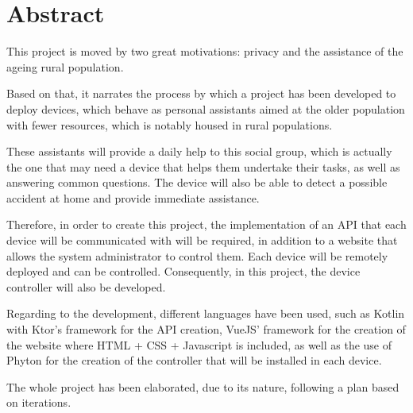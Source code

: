\documentclass[openright,twoside,10pt]{book}
\begin{document}
\chapter*{Abstract} %
\begin{flushleft} %

This project is moved by two great motivations: privacy and the assistance of the ageing rural population. 

Based on that, it narrates the process by which a project has been developed to deploy devices, which behave as personal assistants aimed at the older population with fewer resources, which is notably housed in rural populations. 

These assistants will provide a daily help to this social group, which is actually the one that may need a device that helps them undertake their tasks, as well as answering common questions. The device will also be able to detect a possible accident at home and provide immediate assistance. 

Therefore, in order to create this project, the implementation of an API that each device will be communicated with will be required, in addition to a website that allows the system administrator to control them. Each device will be remotely deployed and can be controlled. Consequently, in this project, the device controller will also be developed. 

Regarding to the development, different languages have been used, such as Kotlin with Ktor’s framework for the API creation, VueJS’ framework for the creation of the website where HTML + CSS + Javascript is included, as well as the use of Phyton for the creation of the controller that will be installed in each device. 

The whole project has been elaborated, due to its nature, following a plan based on iterations.

\end{flushleft}

\tableofcontents %

\cleardoublepage
{} %
\listoffigures %

\cleardoublepage
{} %
\end{document}
